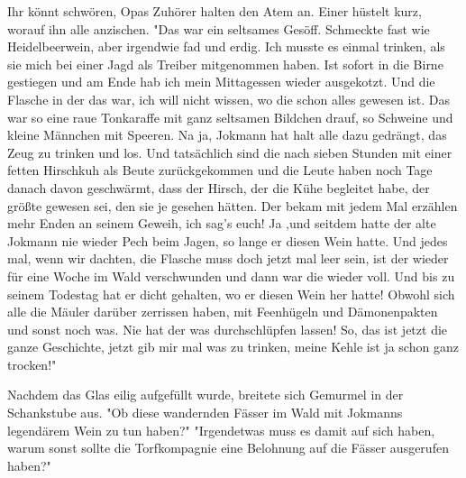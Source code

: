 Ihr könnt schwören, Opas Zuhörer halten den Atem an. Einer hüstelt kurz, worauf ihn alle anzischen. "Das war ein seltsames Gesöff. Schmeckte fast wie Heidelbeerwein, aber irgendwie fad und erdig. Ich musste es einmal trinken, als sie mich bei einer Jagd als Treiber mitgenommen haben. Ist sofort in die Birne gestiegen und am Ende hab ich mein Mittagessen wieder ausgekotzt. Und die Flasche in der das war, ich will nicht wissen, wo die schon alles gewesen ist. Das war so eine raue Tonkaraffe mit ganz seltsamen Bildchen drauf, so Schweine und kleine Männchen mit Speeren. 
Na ja, Jokmann hat halt alle dazu gedrängt, das Zeug zu trinken und los. Und tatsächlich sind die nach sieben Stunden mit einer fetten Hirschkuh als Beute zurückgekommen und die Leute haben noch Tage danach davon geschwärmt, dass der Hirsch, der die Kühe begleitet habe, der größte gewesen sei, den sie je gesehen hätten. Der bekam mit jedem Mal erzählen mehr Enden an seinem Geweih, ich sag's euch! 
Ja ,und seitdem hatte der alte Jokmann nie wieder Pech beim Jagen, so lange er diesen Wein hatte. Und jedes mal, wenn wir dachten, die Flasche muss doch jetzt mal leer sein, ist der wieder für eine Woche im Wald verschwunden und dann war die wieder voll. Und bis zu seinem Todestag hat er dicht gehalten, wo er diesen Wein her hatte! Obwohl sich alle die Mäuler darüber zerrissen haben, mit Feenhügeln und Dämonenpakten und sonst noch was. Nie hat der was durchschlüpfen lassen! So, das ist jetzt die ganze Geschichte, jetzt gib mir mal was zu trinken, meine Kehle ist ja schon ganz trocken!"

Nachdem das Glas eilig aufgefüllt wurde, breitete sich Gemurmel in der Schankstube aus. "Ob diese wandernden Fässer im Wald mit Jokmanns legendärem Wein zu tun haben?" "Irgendetwas muss es damit auf sich haben, warum sonst sollte die Torfkompagnie eine Belohnung auf die Fässer ausgerufen haben?"








